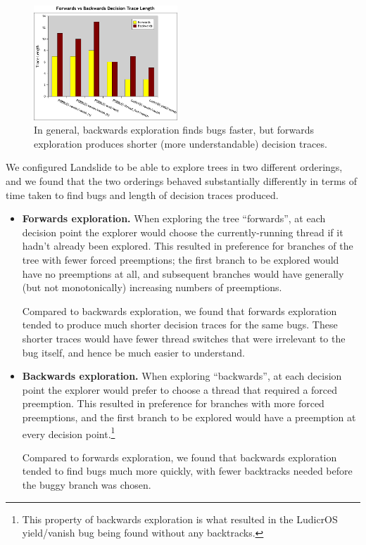 {\begin{figure}[h]
	\hspace{0.02\textwidth}
	\includegraphics[width=0.48\textwidth]{graphs/backwards-trace.pdf}
	\caption{In general, backwards exploration finds bugs faster, but forwards exploration produces shorter (more understandable) decision traces.}
	\label{fig:backwards-graphs}
\end{figure}
}

We configured Landslide to be able to explore trees in two different orderings, and we found that the two orderings behaved substantially differently in terms of time taken to find bugs and length of decision traces produced.

\begin{itemize}
	\item {\bf Forwards exploration.} When exploring the tree ``forwards'', at each decision point the explorer would choose the currently-running thread if it hadn't already been explored. This resulted in preference for branches of the tree with fewer forced preemptions; the first branch to be explored would have no preemptions at all, and subsequent branches would have generally (but not monotonically) increasing numbers of preemptions.

		Compared to backwards exploration, we found that forwards exploration tended to produce much shorter decision traces for the same bugs. These shorter traces would have fewer thread switches that were irrelevant to the bug itself, and hence be much easier to understand.
	\item {\bf Backwards exploration.} When exploring ``backwards'', at each decision point the explorer would prefer to choose a thread that required a forced preemption. This resulted in preference for branches with more forced preemptions, and the first branch to be explored would have a preemption at every decision point.\footnote{
		This property of backwards exploration is what resulted in the LudicrOS yield/vanish bug being found without any backtracks.}

		Compared to forwards exploration, we found that backwards exploration tended to find bugs much more quickly, with fewer backtracks needed before the buggy branch was chosen.
\end{itemize}

